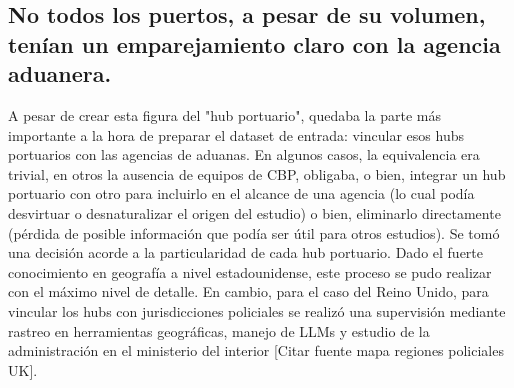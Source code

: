 \documentclass{article}
\begin{document}
\subsection{No todos los puertos, a pesar de su volumen, tenían un emparejamiento claro con la agencia aduanera.}
A pesar de crear esta figura del "hub portuario", quedaba la parte más importante a la hora de preparar el dataset de entrada: vincular esos hubs portuarios con las agencias de aduanas. En algunos casos, la equivalencia era trivial, en otros la ausencia de equipos de CBP, obligaba, o bien, integrar un hub portuario con otro para incluirlo en el alcance de una agencia (lo cual podía desvirtuar o desnaturalizar el origen del estudio) o bien, eliminarlo directamente (pérdida de posible información que podía ser útil para otros estudios). Se tomó una decisión acorde a la particularidad de cada hub portuario. Dado el fuerte conocimiento en geografía a nivel estadounidense, este proceso se pudo realizar con el máximo nivel de detalle. En cambio, para el caso del Reino Unido, para vincular los hubs con jurisdicciones policiales se realizó una supervisión mediante rastreo en herramientas geográficas, manejo de LLMs y estudio de la administración en el ministerio del interior [Citar fuente mapa regiones policiales UK].
\end{document}
